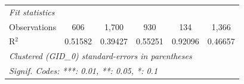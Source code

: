 \begin{tabular}{lccccc}
   \midrule
   \emph{Fit statistics}\\
   Observations       & 606                     & 1,700                   & 930                     & 134                            & 1,366\\  
   R$^2$              & 0.51582                 & 0.39427                 & 0.55251                 & 0.92096                        & 0.46657\\  
   \midrule \midrule
   \multicolumn{6}{l}{\emph{Clustered (GID\_0) standard-errors in parentheses}}\\
   \multicolumn{6}{l}{\emph{Signif. Codes: ***: 0.01, **: 0.05, *: 0.1}}\\
\end{tabular}
\par\endgroup



